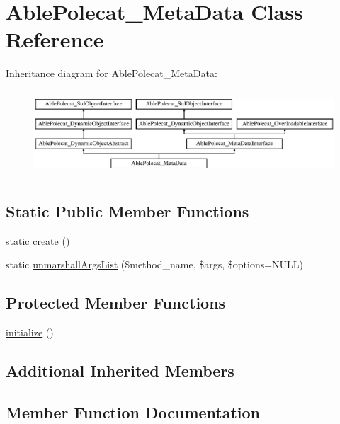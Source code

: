 \hypertarget{class_able_polecat___meta_data}{}\section{Able\+Polecat\+\_\+\+Meta\+Data Class Reference}
\label{class_able_polecat___meta_data}
Inheritance diagram for Able\+Polecat\+\_\+\+Meta\+Data\+:\begin{figure}[H]
\begin{center}
\leavevmode
\includegraphics[height=3.232323cm]{class_able_polecat___meta_data}
\end{center}
\end{figure}
\subsection*{Static Public Member Functions}
\begin{DoxyCompactItemize}
\item 
static \hyperlink{class_able_polecat___meta_data_a239b1c70258014a86569483c2d009de6}{create} ()
\item 
static \hyperlink{class_able_polecat___meta_data_a94d2e558bba777f54dcc10f1bfc4dca5}{unmarshall\+Args\+List} (\$method\+\_\+name, \$args, \$options=N\+U\+L\+L)
\end{DoxyCompactItemize}
\subsection*{Protected Member Functions}
\begin{DoxyCompactItemize}
\item 
\hyperlink{class_able_polecat___meta_data_a91098fa7d1917ce4833f284bbef12627}{initialize} ()
\end{DoxyCompactItemize}
\subsection*{Additional Inherited Members}


\subsection{Member Function Documentation}
\hypertarget{class_able_polecat___meta_data_a239b1c70258014a86569483c2d009de6}{}
